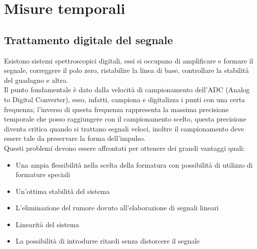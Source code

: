 \chapter{Misure temporali}
\section{Trattamento digitale del segnale}
Esistono sistemi spettroscopici digitali, essi si occupano di amplificare e formare il segnale, correggere il polo zero, ristabilire la linea di base,
controllare la stabilit\`a del guadagno e altro.\\
Il punto fondamentale \`e dato dalla velocit\`a di campionamento dell'ADC (Analog to Digital Converter), esso, infatti, campiona e digitalizza i punti con una
certa frequenza; l'inverso di questa frequenza rappresenta la massima precisione temporale che posso raggiungere con il campionamento scelto, 
questa precisione diventa critica quando si trattano segnali veloci, inoltre il campionamento deve essere tale da preservare la forma dell'impulso.\\
Questi problemi devono essere affrontati per ottenere dei grandi vantaggi quali:
\begin{itemize}
\item Una ampia flessibilit\`a nella scelta della formatura con possibilit\`a di utilizzo di formature speciali
\item Un'ottima stabilit\`a del sistema
\item L'eliminazione del rumore dovuto all'elaborazione di segnali lineari
\item Linearit\`a del sistema
\item La possibilit\`a di introdurre ritardi senza distorcere il segnale
\end{itemize}
